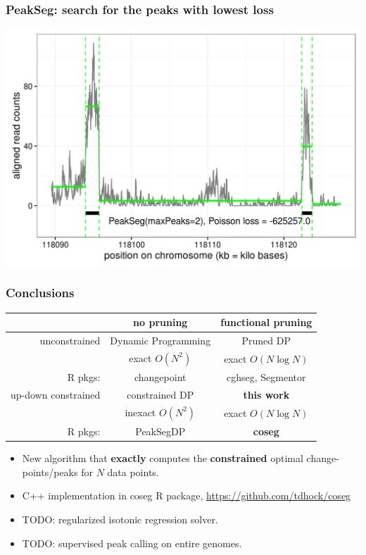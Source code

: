 \documentclass{beamer}
\begin{document}
\begin{frame}
  \frametitle{PeakSeg: search for the peaks with lowest loss}
  \includegraphics[width=1\textwidth]{figure-macs-problem-PeakSeg.png}
\end{frame}

\begin{frame}
  \frametitle{Conclusions}
  \begin{tabular}{r|c|c}
    & no pruning & functional pruning \\
    \hline
    unconstrained & Dynamic Programming & Pruned DP \\
     & exact $O(N^2)$ & exact $O(N\log N)$\\
    R pkgs: & changepoint & cghseg, Segmentor\\
    \hline
    up-down constrained & constrained DP & \textbf{this work} \\
     & inexact $O(N^2)$ & exact $O(N\log N)$\\
    R pkgs: & PeakSegDP & \textbf{coseg}\\
    \hline
  \end{tabular}
  \begin{itemize}
  \item New algorithm that \textbf{exactly} computes the
    \textbf{constrained} optimal change-points/peaks for $N$ data points.
  \item C++ implementation in coseg R package, 
    \url{https://github.com/tdhock/coseg}
  \item TODO: regularized isotonic regression solver.
  \item TODO: supervised peak calling on entire genomes.
  \end{itemize}
\end{frame}
\end{document}
